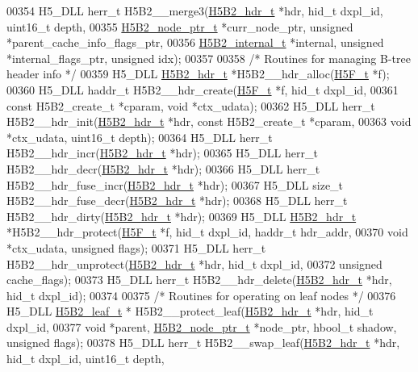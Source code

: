 \begin{DoxyCode}
{{00354 H5\_DLL herr\_t H5B2\_\_merge3(\hyperlink{struct_h5_b2__hdr__t}{H5B2\_hdr\_t} *hdr, hid\_t dxpl\_id, uint16\_t depth,
00355     \hyperlink{struct_h5_b2__node__ptr__t}{H5B2\_node\_ptr\_t} *curr\_node\_ptr, \textcolor{keywordtype}{unsigned} *parent\_cache\_info\_flags\_ptr,
00356     \hyperlink{struct_h5_b2__internal__t}{H5B2\_internal\_t} *\textcolor{keyword}{internal}, \textcolor{keywordtype}{unsigned} *internal\_flags\_ptr, \textcolor{keywordtype}{unsigned} idx);
00357 
00358 \textcolor{comment}{/* Routines for managing B-tree header info */}
00359 H5\_DLL \hyperlink{struct_h5_b2__hdr__t}{H5B2\_hdr\_t} *H5B2\_\_hdr\_alloc(\hyperlink{struct_h5_f__t}{H5F\_t} *f);
00360 H5\_DLL haddr\_t H5B2\_\_hdr\_create(\hyperlink{struct_h5_f__t}{H5F\_t} *f, hid\_t dxpl\_id,
00361     \textcolor{keyword}{const} H5B2\_create\_t *cparam, \textcolor{keywordtype}{void} *ctx\_udata);
00362 H5\_DLL herr\_t H5B2\_\_hdr\_init(\hyperlink{struct_h5_b2__hdr__t}{H5B2\_hdr\_t} *hdr, \textcolor{keyword}{const} H5B2\_create\_t *cparam,
00363     \textcolor{keywordtype}{void} *ctx\_udata, uint16\_t depth);
00364 H5\_DLL herr\_t H5B2\_\_hdr\_incr(\hyperlink{struct_h5_b2__hdr__t}{H5B2\_hdr\_t} *hdr);
00365 H5\_DLL herr\_t H5B2\_\_hdr\_decr(\hyperlink{struct_h5_b2__hdr__t}{H5B2\_hdr\_t} *hdr);
00366 H5\_DLL herr\_t H5B2\_\_hdr\_fuse\_incr(\hyperlink{struct_h5_b2__hdr__t}{H5B2\_hdr\_t} *hdr);
00367 H5\_DLL \textcolor{keywordtype}{size\_t} H5B2\_\_hdr\_fuse\_decr(\hyperlink{struct_h5_b2__hdr__t}{H5B2\_hdr\_t} *hdr);
00368 H5\_DLL herr\_t H5B2\_\_hdr\_dirty(\hyperlink{struct_h5_b2__hdr__t}{H5B2\_hdr\_t} *hdr);
00369 H5\_DLL \hyperlink{struct_h5_b2__hdr__t}{H5B2\_hdr\_t} *H5B2\_\_hdr\_protect(\hyperlink{struct_h5_f__t}{H5F\_t} *f, hid\_t dxpl\_id, haddr\_t hdr\_addr,
00370     \textcolor{keywordtype}{void} *ctx\_udata, \textcolor{keywordtype}{unsigned} flags);
00371 H5\_DLL herr\_t H5B2\_\_hdr\_unprotect(\hyperlink{struct_h5_b2__hdr__t}{H5B2\_hdr\_t} *hdr, hid\_t dxpl\_id,
00372     \textcolor{keywordtype}{unsigned} cache\_flags);
00373 H5\_DLL herr\_t H5B2\_\_hdr\_delete(\hyperlink{struct_h5_b2__hdr__t}{H5B2\_hdr\_t} *hdr, hid\_t dxpl\_id);
00374 
00375 \textcolor{comment}{/* Routines for operating on leaf nodes */}
00376 H5\_DLL \hyperlink{struct_h5_b2__leaf__t}{H5B2\_leaf\_t} * H5B2\_\_protect\_leaf(\hyperlink{struct_h5_b2__hdr__t}{H5B2\_hdr\_t} *hdr, hid\_t dxpl\_id,
00377     \textcolor{keywordtype}{void} *parent, \hyperlink{struct_h5_b2__node__ptr__t}{H5B2\_node\_ptr\_t} *node\_ptr, hbool\_t shadow, \textcolor{keywordtype}{unsigned} flags);
00378 H5\_DLL herr\_t H5B2\_\_swap\_leaf(\hyperlink{struct_h5_b2__hdr__t}{H5B2\_hdr\_t} *hdr, hid\_t dxpl\_id, uint16\_t depth,
}}
\end{DoxyCode}
